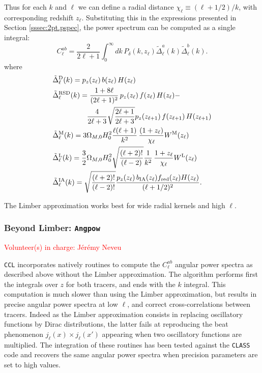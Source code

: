 \documentclass[\docopts]{\docclass}
\newcommand{\vol}[1]{\textcolor{red}{Volunteer(s) in charge: #1}}
\newcommand{\ccl}{{\tt CCL}\xspace}
\begin{document}
Thus for each $k$ and $\ell$ we can define a radial distance $\chi_\ell\equiv(\ell+1/2)/k$, with corresponding redshift $z_\ell$. Substituting this in the expressions presented in Section \ref{sssec:2pt.pspec}, the power spectrum can be computed as a single integral:
\begin{equation}\label{eq:limber}
 C^{ab}_\ell=\frac{2}{2\ell+1}\int_0^\infty dk\,P_\delta\left(k,z_\ell\right)
 \tilde{\Delta}^a_\ell(k)\tilde{\Delta}^b_\ell(k).
\end{equation}
where
\begin{align}
 &\tilde{\Delta}_\ell^{\rm D}(k)=p_z(z_\ell)\,b(z_\ell)\,H(z_\ell)\\
 &\tilde{\Delta}_\ell^{\rm RSD}(k)=
 \frac{1+8\ell}{(2\ell+1)^2}\,p_z(z_\ell)\,f(z_\ell)\,H(z_\ell)-\\\nonumber
 &\hspace{48pt}\frac{4}{2\ell+3}\sqrt{\frac{2\ell+1}{2\ell+3}}p_z(z_{\ell+1})\,f(z_{\ell+1})\,H(z_{\ell+1})\\
 &\tilde{\Delta}_\ell^{\rm M}(k)=3\Omega_{M,0}H_0^2\frac{\ell(\ell+1)}{k^2}\,
 \frac{(1+z_\ell)}{\chi_\ell}W^{\rm M}(z_\ell)\\
 &\tilde{\Delta}_\ell^{\rm L}(k)=\frac{3}{2}\Omega_{M,0}H_0^2\sqrt{\frac{(\ell+2)!}{(\ell-2)}}\frac{1}{k^2}\,
 \frac{1+z_\ell}{\chi_\ell}W^{\rm L}(z_\ell)\\
 &\tilde{\Delta}_\ell^{\rm IA}(k)=\sqrt{\frac{(\ell+2)!}{(\ell-2)!}}\frac{p_z(z_\ell)\,b_{\rm IA}(z_\ell)f_{\rm red}(z_\ell)H(z_\ell)}{(\ell+1/2)^2}.
\end{align}

The Limber approximation works best for wide radial kernels and high $\ell$.

\subsubsection{Beyond Limber: \texttt{Angpow}}
\label{sec:angpow}
\vol{J\'er\'emy Neveu}

\ccl incorporates natively routines to compute the $C^{ab}_\ell$ angular power spectra as described above without the Limber approximation. The algorithm performs first the integrals over $z$ for both tracers, and ends with the $k$ integral. This computation is much slower than using the Limber approximation, but results in precise angular power spectra at low $\ell$, and correct cross-correlations between tracers. Indeed as the Limber approximation consists in replacing oscillatory functions by Dirac distributions, the latter fails at reproducing the beat phenomenon $j_\ell(x)\times j_\ell(x')$ appearing when two oscillatory functions are multiplied. The integration of these routines has been tested against the \texttt{CLASS} code and recovers the same angular power spectra when precision parameters are set to high values.
\end{document}
